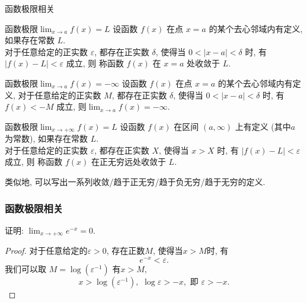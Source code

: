 \documentclass[
10pt,
aspectratio=43,
]{beamer}
\begin{document}
\begin{frame}{函数极限相关}
    \begin{block}{函数极限$\lim_{x\to a}f(x)=L$}
        设函数 $f(x)$ 在点 {\color{red}$x=a$} 的某个去心邻域内有定义, 如果存在{\color{green}常数 $L$}.\\
        {\color{blue}对于任意给定的正实数 $\varepsilon$}, 都存在{\color{red}正实数 $\delta$, 使得当 $0 < |x-a| < \delta$ 时}, {\color{blue}有 $|f(x) - L| < \varepsilon$ 成立}, 则{\color{green} 称函数 $f(x)$ 在 $x=a$ 处收敛于 $L$}.
    \end{block}
    \pause
    \begin{block}{函数极限$\lim_{x\to a}f(x)=-\infty$}
        设函数 $f(x)$ 在点 {\color{red}$x=a$} 的某个去心邻域内有定义, {\color{blue}对于任意给定的正实数 $M$}, 都存在{\color{red}正实数 $\delta$, 使得当 $0 < |x-a| < \delta$ 时}, {\color{blue}有 $f(x) < -M$ 成立}, 则$\displaystyle\lim_{x\to a}f(x)=-\infty$.
    \end{block}
    \pause
    \begin{block}{函数极限$\lim_{x\to +\infty}f(x)=L$}
        设函数 $f(x)$ 在区间 $(a,\infty)$ 上有定义 (其中$a$为常数), 如果存在{\color{green}常数 $L$}.\\
        {\color{blue}对于任意给定的正实数 $\varepsilon$}, 都存在{\color{red}正实数 $X$, 使得当 $x> X$ 时}, {\color{blue}有 $|f(x) - L| < \varepsilon$ 成立}, 则{\color{green} 称函数 $f(x)$ 在正无穷远处收敛于 $L$}.
    \end{block}
    类似地, 可以写出一系列收敛/趋于正无穷/趋于负无穷/趋于无穷的定义.
\end{frame}

\begin{frame}
    \frametitle{函数极限相关}
    \begin{block}{}
        证明: $\lim _{x \rightarrow+\infty} e^{-x}=0$.
    \end{block}
    \pause
    \begin{proof}
        对于任意给定的$\varepsilon>0$, 存在正数$M$, 使得当$x > M$时, 有
        $$
            e^{-x} < \varepsilon.
        $$
        我们可以取 $M=\log (\varepsilon^{-1})$ 有$x > M$,
        $$
            x>\log(\varepsilon^{-1}),\,\,\log\varepsilon>-x,\,\,\text{即}\,\,\varepsilon>-x.
        $$
    \end{proof}
\end{frame}
\end{document}
